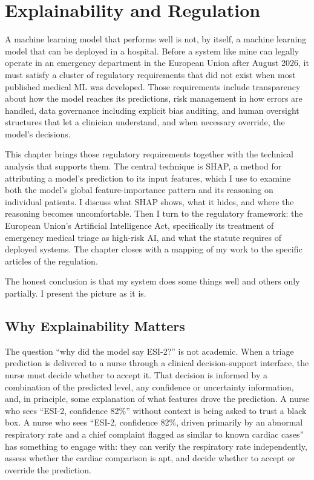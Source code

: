 
\chapter{Explainability and Regulation}
\label{ch:explainability}

A machine learning model that performs well is not, by itself, a machine learning model that can be deployed in a hospital. Before a system like mine can legally operate in an emergency department in the European Union after August 2026, it must satisfy a cluster of regulatory requirements that did not exist when most published medical ML was developed. Those requirements include transparency about how the model reaches its predictions, risk management in how errors are handled, data governance including explicit bias auditing, and human oversight structures that let a clinician understand, and when necessary override, the model's decisions.

This chapter brings those regulatory requirements together with the technical analysis that supports them. The central technique is SHAP, a method for attributing a model's prediction to its input features, which I use to examine both the model's global feature-importance pattern and its reasoning on individual patients. I discuss what SHAP shows, what it hides, and where the reasoning becomes uncomfortable. Then I turn to the regulatory framework: the European Union's Artificial Intelligence Act, specifically its treatment of emergency medical triage as high-risk AI, and what the statute requires of deployed systems. The chapter closes with a mapping of my work to the specific articles of the regulation.

The honest conclusion is that my system does some things well and others only partially. I present the picture as it is.

\section{Why Explainability Matters}

The question ``why did the model say ESI-2?'' is not academic. When a triage prediction is delivered to a nurse through a clinical decision-support interface, the nurse must decide whether to accept it. That decision is informed by a combination of the predicted level, any confidence or uncertainty information, and, in principle, some explanation of what features drove the prediction. A nurse who sees ``ESI-2, confidence 82\%'' without context is being asked to trust a black box. A nurse who sees ``ESI-2, confidence 82\%, driven primarily by an abnormal respiratory rate and a chief complaint flagged as similar to known cardiac cases'' has something to engage with: they can verify the respiratory rate independently, assess whether the cardiac comparison is apt, and decide whether to accept or override the prediction.

